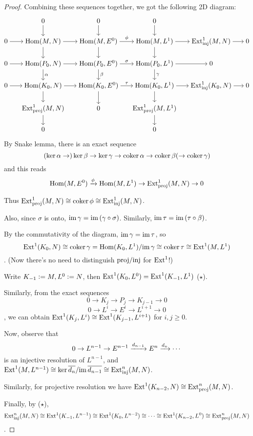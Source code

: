 \begin{theorem}
\begin{proof}
    Combining these sequences together, we got the following 2D diagram:

    $$
      \begin{tikzcd}[cramped, sep=15pt]
        & 0 \ar[d] & 0 \ar[d] & 0 \ar[d] \\
        0 \ar[r] & \Hom(M, N) \ar[r] \ar[d] & \Hom(M, E^0) \ar[r, "\phi"] \ar[d] &
        \Hom(M, L^1) \ar[r] \ar[d] & \Ext_\inj^1(M, N) \ar[r] & 0 \\
        0 \ar[r] & \Hom(P_0, N) \ar[r] \ar[d, "\alpha"] & \Hom(P_0, E^0) \ar[r, "\sigma"] \ar[d, "\beta"] &
        \Hom(P_0, L^1) \ar[r] \ar[d, "\gamma"] & 0 \\
        0 \ar[r] & \Hom(K_0, N) \ar[r] \ar[d] & \Hom(K_0, E^0) \ar[r, "\tau"] \ar[d] &
        \Hom(K_0, L^1) \ar[r] \ar[d] & \Ext_\inj^1(K_0, N) \ar[r] & 0 \\
        & \Ext_\proj^1(M, N) \ar[d] & 0 & \Ext_\proj^1(M, L^1) \ar[d] \\
        & 0 & & 0
      \end{tikzcd}
    $$

    By Snake lemma, there is an exact sequence
    $$(\ker \alpha \to )\ker \beta \to \ker \gamma \to \mathrm{coker}\, \alpha \to \mathrm{coker}\, \beta( \to \mathrm{coker}\, \gamma)$$
    and this reads
    $$\operatorname{Hom} (M, E^0) \xrightarrow{\phi} \operatorname{Hom}(M, L^1) \to \operatorname{Ext}_{\mathrm{proj}}^1(M, N) \to 0$$

    Thus $\operatorname{Ext}_{\mathrm{proj}}^1(M, N) \cong \mathrm{coker}\, \phi \cong \operatorname{Ext}_{\mathrm{inj}}^1(M, N)$.

    Also, since $\sigma$ is onto, $\mathrm{im}\, \gamma = \mathrm{im}\, (\gamma \circ \sigma)$.
    Similarly, $\mathrm{im}\, \tau = \mathrm{im}\, (\tau \circ \beta)$.

    By the commutativity of the diagram, $\mathrm{im}\, \gamma = \mathrm{im}\, \tau$, so
    $$\operatorname{Ext}^1(K_0, N) \cong \mathrm{coker}\, \gamma = \operatorname{Hom}(K_0, L^1)/\mathrm{im}\, \gamma
    \cong \mathrm{coker}\, \tau \cong \operatorname{Ext}^1(M, L^1)$$.
    (Now there's no need to distinguish $\mathrm{proj} / \mathrm{inj}$ for $\operatorname{Ext}^1$!)

    Write $K_{-1} \vcentcolon= M, L^0 \vcentcolon= N$, then $\operatorname{Ext}^1(K_0, L^0) = \operatorname{Ext}^1(K_{-1}, L^1)$ ($\star$).

    Similarly, from the exact sequences
    $$ 0 \to K_j \to P_j \to K_{j-1} \to 0 $$
    $$ 0 \to L^i \to E^i \to L^{i+1} \to 0 $$,
    we can obtain $\operatorname{Ext}^1(K_j, L^i) \cong \operatorname{Ext}^1(K_{j-1}, L^{i+1})$ for $i, j \geq 0$.

    Now, observe that
    $$0 \to L^{n-1} \to E^{n-1} \xrightarrow{d_{n-1}} E^n \xrightarrow{d_n} \cdots$$
    is an injective resolution of $L^{n-1}$, and
    $\operatorname{Ext}^1(M, L^{n-1}) \cong \ker \overline{d_n} / \mathrm{im}\, \overline{d_{n-1}} \cong \operatorname{Ext}_{\mathrm{inj}}^n(M, N)$.

    Similarly, for projective resolution we have $\operatorname{Ext}^1(K_{n-2}, N) \cong \operatorname{Ext}_{\mathrm{proj}}^n(M, N)$.

    Finally, by ($\star$),  
    $$\operatorname{Ext}_{\mathrm{inj}}^n(M, N) \cong \operatorname{Ext}^1(K_{-1}, L^{n-1}) \cong \operatorname{Ext}^1(K_0, L^{n-2}) \cong \cdots
    \cong \operatorname{Ext}^1(K_{n-2}, L^0) \cong \operatorname{Ext}_{\mathrm{proj}}^n(M, N)$$.

  \end{proof}
\end{theorem}

